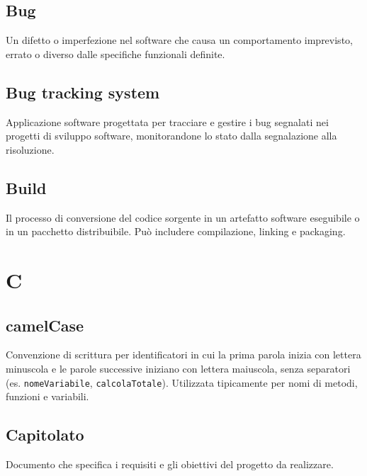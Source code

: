 \documentclass[a4paper, 11pt, oneside]{scrartcl} %
\begin{document}
\subsection*{Bug}
Un difetto o imperfezione nel software che causa un comportamento imprevisto, errato o diverso dalle specifiche funzionali definite.
\vspace{0.5cm}

\subsection*{Bug tracking system}
Applicazione software progettata per tracciare e gestire i bug segnalati nei progetti di sviluppo software, monitorandone lo stato dalla segnalazione alla risoluzione.
\vspace{0.5cm}

\subsection*{Build}
Il processo di conversione del codice sorgente in un artefatto software eseguibile o in un pacchetto distribuibile. Può includere compilazione, linking e packaging.
\vspace{0.5cm}



\section*{C}


\subsection*{camelCase}
Convenzione di scrittura per identificatori in cui la prima parola inizia con lettera minuscola e le parole successive iniziano con lettera maiuscola, senza separatori (es. \texttt{nomeVariabile}, \texttt{calcolaTotale}). Utilizzata tipicamente per nomi di metodi, funzioni e variabili.
\vspace{0.5cm}

\subsection*{Capitolato}
Documento che specifica i requisiti e gli obiettivi del progetto da realizzare.
\vspace{0.5cm}
\end{document}
